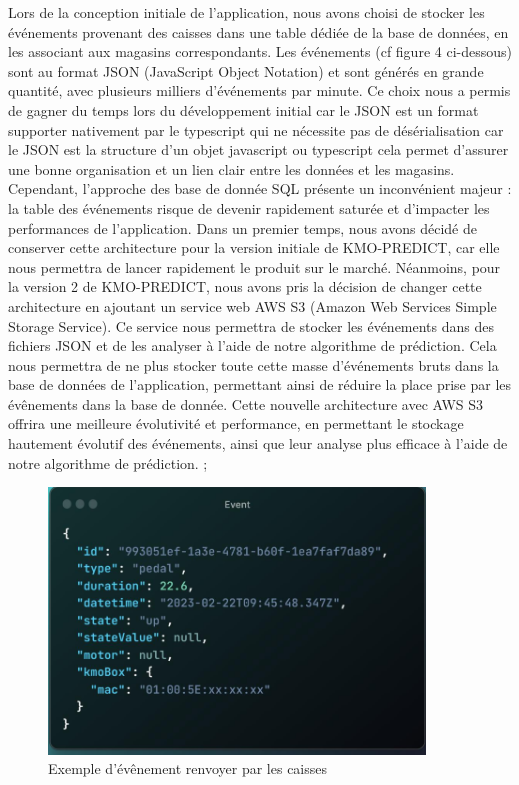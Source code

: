 \documentclass[12pt]{article}
\begin{document}
\justify
\text Lors de la conception initiale de l'application, nous avons choisi de stocker les événements provenant des caisses dans une table dédiée de la base de données, en les associant aux magasins correspondants. Les événements (cf figure 4 ci-dessous) sont au format JSON (JavaScript Object Notation) et sont générés en grande quantité, avec plusieurs milliers d'événements par minute. Ce choix nous a permis de gagner du temps lors du développement initial car le JSON est un format supporter nativement par le typescript qui ne nécessite pas de désérialisation car le JSON est la structure d'un objet javascript ou typescript cela permet d'assurer une bonne organisation et un lien clair entre les données et les magasins.
Cependant, l'approche des base de donnée SQL présente un inconvénient majeur : la table des événements risque de devenir rapidement saturée et d'impacter les performances de l'application. Dans un premier temps, nous avons décidé de conserver cette architecture pour la version initiale de KMO-PREDICT, car elle  nous permettra de lancer rapidement le produit sur le marché.
Néanmoins, pour la version 2 de KMO-PREDICT, nous avons pris la décision de changer cette architecture en ajoutant un service web AWS S3 (Amazon Web Services Simple Storage Service). Ce service nous permettra de stocker les événements dans des fichiers JSON et de les analyser à l'aide de notre algorithme de prédiction. Cela nous permettra de ne plus stocker toute cette masse d'événements bruts dans la base de données de l'application, permettant ainsi de réduire la place prise par les évênements dans la base de donnée.
Cette nouvelle architecture avec AWS S3 offrira une meilleure évolutivité et performance, en permettant le stockage hautement évolutif des événements, ainsi que leur analyse plus efficace à l'aide de notre algorithme de prédiction.
;

\vspace{12pt }
\centering
\begin{figure}[H]
    \centering
    \includegraphics[width=10cm]{img/exemple_event.png}
    \caption{Exemple d'évênement renvoyer par les caisses}
    \label{fig:enter-label}
\end{figure}
\end{document}
